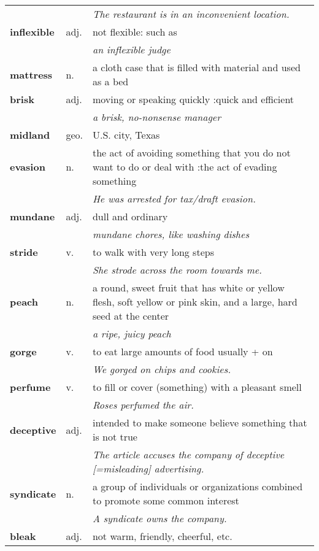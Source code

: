 \documentclass[a4paper]{article}
\begin{document}
\begin{longtable}{llp{12cm}}
 & & \textit{The restaurant is in an inconvenient location.}\\[0.08cm]
\textbf{inflexible} & adj. &  not flexible: such as\\
 & & \textit{an inflexible judge}\\[0.08cm]
\textbf{mattress} & n. &  a cloth case that is filled with material and used as a bed \\[0.08cm]
\textbf{brisk} & adj. &  moving or speaking quickly :quick and efficient \\
 & & \textit{a brisk, no-nonsense manager}\\[0.08cm]
\textbf{midland} & geo. &  U.S. city, Texas\\[0.08cm]
\textbf{evasion} & n. &  the act of avoiding something that you do not want to do or deal with :the act of evading something \\
 & & \textit{He was arrested for tax/draft evasion.}\\[0.08cm]
\textbf{mundane} & adj. &  dull and ordinary \\
 & & \textit{mundane chores, like washing dishes}\\[0.08cm]
\textbf{stride} & v. &  to walk with very long steps \\
 & & \textit{She strode across the room towards me.}\\[0.08cm]
\textbf{peach} & n. &  a round, sweet fruit that has white or yellow flesh, soft yellow or pink skin, and a large, hard seed at the center \\
 & & \textit{a ripe, juicy peach}\\[0.08cm]
\textbf{gorge} & v. &  to eat large amounts of food usually + on \\
 & & \textit{We gorged on chips and cookies.}\\[0.08cm]
\textbf{perfume} & v. &  to fill or cover (something) with a pleasant smell \\
 & & \textit{Roses perfumed the air.}\\[0.08cm]
\textbf{deceptive} & adj. &  intended to make someone believe something that is not true \\
 & & \textit{The article accuses the company of deceptive [=misleading] advertising.}\\[0.08cm]
\textbf{syndicate} & n. &  a group of individuals or organizations combined to promote some common interest\\
 & & \textit{A syndicate owns the company.}\\[0.08cm]
\textbf{bleak} & adj. &  not warm, friendly, cheerful, etc. \\

\end{longtable}
\end{document}
